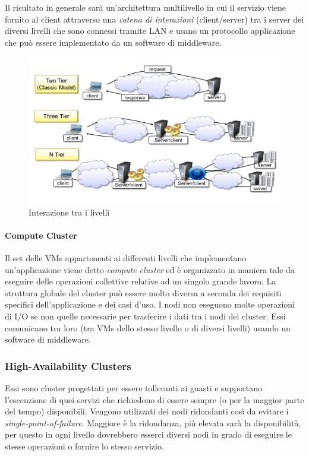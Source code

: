 \documentclass{article}
\begin{document}
Il risultato in generale sarà un’architettura multilivello in cui il servizio viene fornito al client attraverso una \textit{catena di interazioni} (client/server) tra i server dei diversi livelli che sono connessi tramite LAN e usano un protocollo applicazione che può essere implementato da un software di middleware.
\begin{figure}[H]
\centering
\includegraphics[scale=0.6]{img/interaction_chain.png}
\caption{Interazione tra i livelli}
\end{figure}
\paragraph{Compute Cluster}
Il set delle VMs appartenenti ai differenti livelli che implementano un’applicazione viene detto \textit{compute cluster} ed è organizzato in maniera tale da eseguire delle operazioni collettive relative ad un singolo grande lavoro. La struttura globale del cluster può essere molto diversa a seconda dei requisiti specifici dell’applicazione e dei casi d’uso.
I nodi non eseguono molte operazioni di I/O se non quelle necessarie per trasferire i dati tra i nodi del cluster.
Essi comunicano tra loro (tra VMs dello stesso livello o di diversi livelli) usando un software di middleware.

\subsubsection{High-Availability Clusters}
Essi sono cluster progettati per essere tolleranti ai guasti e supportano l’esecuzione di quei servizi che richiedono di essere sempre (o per la maggior parte del tempo) disponibili. 
Vengono utilizzati dei nodi ridondanti così da evitare i \textit{single-point-of-failure}.
Maggiore è la ridondanza, più elevata sarà la disponibilità, per questo in ogni livello dovrebbero esserci diversi nodi in grado di eseguire le stesse operazioni o fornire lo stesso servizio.
\end{document}
